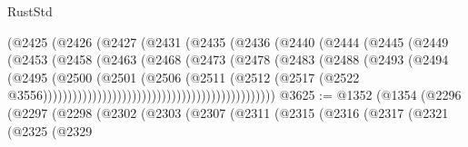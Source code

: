 \begin{lexlean}{RustStd}
\begin{coremodule}
                                          (@2425
                                            (@2426
                                              (@2427
                                                (@2431
                                                  (@2435
                                                    (@2436
                                                      (@2440
                                                        (@2444
                                                          (@2445
                                                            (@2449
                                                              (@2453
                                                                (@2458
                                                                  (@2463
                                                                    (@2468
                                                                      (@2473
                                                                        (@2478
                                                                          (@2483
                                                                            (@2488
                                                                              (@2493
                                                                                (@2494
                                                                                  (@2495
                                                                                    (@2500
                                                                                      (@2501
                                                                                        (@2506
                                                                                          (@2511
                                                                                            (@2512
                                                                                              (@2517
                                                                                                (@2522
                                                                                                  @3556)))))))))))))))))))))))))))))))))))))))))))))))
@3625 := @1352
    (@1354
      (@2296
        (@2297
          (@2298
            (@2302
              (@2303
                (@2307
                  (@2311
                    (@2315
                      (@2316
                        (@2317
                          (@2321
                            (@2325
                              (@2329

\end{coremodule}
\end{lexlean}
